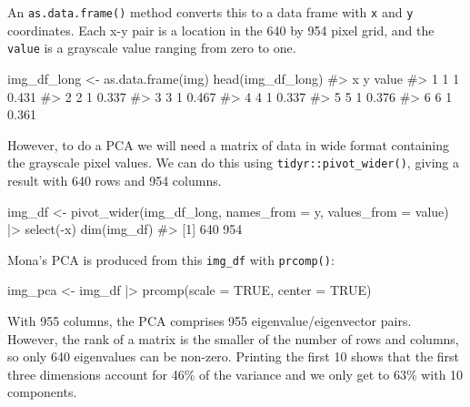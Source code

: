 \documentclass[
  letterpaper,
  10pt,
  krantz2]{krantz}
\makeatletter
\newenvironment{Shaded}{\begin{snugshade}}{\end{snugshade}}
\newcommand{\AttributeTok}[1]{\textcolor[rgb]{0.40,0.45,0.13}{#1}}
\newcommand{\CommentTok}[1]{\textcolor[rgb]{0.37,0.37,0.37}{#1}}
\newcommand{\ConstantTok}[1]{\textcolor[rgb]{0.56,0.35,0.01}{#1}}
\newcommand{\FunctionTok}[1]{\textcolor[rgb]{0.28,0.35,0.67}{#1}}
\newcommand{\NormalTok}[1]{\textcolor[rgb]{0.00,0.23,0.31}{#1}}
\newcommand{\OtherTok}[1]{\textcolor[rgb]{0.00,0.23,0.31}{#1}}
\newcommand{\SpecialCharTok}[1]{\textcolor[rgb]{0.37,0.37,0.37}{#1}}
\newenvironment{kframe}{%
  \medskip{}
  \setlength{\fboxsep}{.8em}
  \def\at@end@of@kframe{}%
  \ifinner\ifhmode%
  \def\at@end@of@kframe{\end{minipage}}%
  \begin{minipage}{\columnwidth}%
  \fi\fi%
  \def\FrameCommand##1{\hskip\@totalleftmargin \hskip-\fboxsep
  \colorbox{shadecolor}{##1}\hskip-\fboxsep
      \hskip-\linewidth \hskip-\@totalleftmargin \hskip\columnwidth}%
  \MakeFramed {\advance\hsize-\width
    \@totalleftmargin\z@ \linewidth\hsize
    \@setminipage}}%
{\par\unskip\endMakeFramed%
  \at@end@of@kframe}
\renewenvironment{Shaded}{\begin{kframe}}{\end{kframe}}
\makeatother
\begin{document}
An \texttt{as.data.frame()} method converts this to a data frame with
\texttt{x} and \texttt{y} coordinates. Each x-y pair is a location in
the 640 by 954 pixel grid, and the \texttt{value} is a grayscale value
ranging from zero to one.

\begin{Shaded}
\begin{Highlighting}[]
\NormalTok{img\_df\_long }\OtherTok{\textless{}{-}} \FunctionTok{as.data.frame}\NormalTok{(img)}
\FunctionTok{head}\NormalTok{(img\_df\_long)}
\CommentTok{\#\textgreater{}   x y value}
\CommentTok{\#\textgreater{} 1 1 1 0.431}
\CommentTok{\#\textgreater{} 2 2 1 0.337}
\CommentTok{\#\textgreater{} 3 3 1 0.467}
\CommentTok{\#\textgreater{} 4 4 1 0.337}
\CommentTok{\#\textgreater{} 5 5 1 0.376}
\CommentTok{\#\textgreater{} 6 6 1 0.361}
\end{Highlighting}
\end{Shaded}

However, to do a PCA we will need a matrix of data in wide format
containing the grayscale pixel values. We can do this using
\texttt{tidyr::pivot\_wider()}, giving a result with 640 rows and 954
columns.

\begin{Shaded}
\begin{Highlighting}[]
\NormalTok{img\_df }\OtherTok{\textless{}{-}} \FunctionTok{pivot\_wider}\NormalTok{(img\_df\_long, }
                     \AttributeTok{names\_from =}\NormalTok{ y, }
                     \AttributeTok{values\_from =}\NormalTok{ value) }\SpecialCharTok{|\textgreater{}}
  \FunctionTok{select}\NormalTok{(}\SpecialCharTok{{-}}\NormalTok{x)}
\FunctionTok{dim}\NormalTok{(img\_df)}
\CommentTok{\#\textgreater{} [1] 640 954}
\end{Highlighting}
\end{Shaded}

Mona's PCA is produced from this \texttt{img\_df} with
\texttt{prcomp()}:

\begin{Shaded}
\begin{Highlighting}[]
\NormalTok{img\_pca }\OtherTok{\textless{}{-}}\NormalTok{ img\_df }\SpecialCharTok{|\textgreater{}}
  \FunctionTok{prcomp}\NormalTok{(}\AttributeTok{scale =} \ConstantTok{TRUE}\NormalTok{, }\AttributeTok{center =} \ConstantTok{TRUE}\NormalTok{)}
\end{Highlighting}
\end{Shaded}

With 955 columns, the PCA comprises 955 eigenvalue/eigenvector pairs.
However, the rank of a matrix is the smaller of the number of rows and
columns, so only 640 eigenvalues can be non-zero. Printing the first 10
shows that the first three dimensions account for 46\% of the variance
and we only get to 63\% with 10 components.
\end{document}
